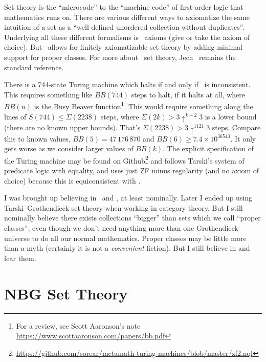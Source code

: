 \begin{node}\label{set-0000}%
Set theory is the ``microcode'' to the ``machine code'' of first-order
logic that mathematics runs on. There are various different ways to
axiomatize the same intuition of a set as a ``well-defined unordered
collection without duplicates''. Underlying all these different
formalisms is \ZFC\ axioms (give or take the axiom of choice). But
\NBG\ allows for finitely axiomatizable set theory by adding minimal
support for proper classes. For more about \ZFC\ set theory,
Jech~\cite{jech2003set} remains the standard reference.
\end{node}

\begin{node}\label{set-0002}%
There is a 744-state Turing machine which halts if and only if \ZFC\ is
inconsistent. This requires something like $BB(744)$ steps to halt, if
it halts at all, where $BB(n)$ is the Busy Beaver function\footnote{For
a review, see Scott Aaronson's note \url{https://www.scottaaronson.com/papers/bb.pdf}}.
This would require something along the lines of
$S(744)\leq\Sigma(2238)$ steps, where $\Sigma(2k)>3\uparrow^{k-2}3$ is a
lower bound (there are no known upper bounds). That's
$\Sigma(2238)>3\uparrow^{1121}3$ steps. Compare this to known values, $BB(5)=47\,176\,870$
and $BB(6)\geq 7.4\times 10^{36543}$. It only gets worse as we consider
larger values of $BB(k)$. The explicit specification of the Turing
machine may be found on Github\footnote{\url{https://github.com/sorear/metamath-turing-machines/blob/master/zf2.nql}}
and follows Tarski's system of predicate logic with equality, and uses
just ZF minus regularity (and no axiom of choice) because this is
equiconsistent with \ZFC.
\end{node}

\begin{node}[Classes]\label{set-0003}%
I was brought up believing in \ZFC\ and \NBG, at least nominally. Later
I ended up using Tarski--Grothendieck set theory when working in
category theory. But I still nominally believe there exists collections
``bigger'' than sets which we call ``proper classes'', even though we
don't need anything more than one Grothendieck universe to do all our
normal mathematics. Proper classes may be little more than a myth
(certainly it is not a \emph{convenient} fiction). But I still believe in
and fear them.
\end{node}

\section{NBG Set Theory}\label{sec:set:nbg}

